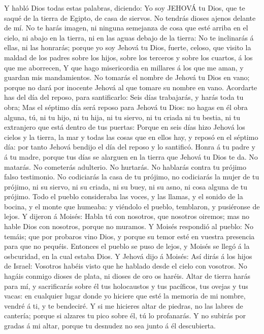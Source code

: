  Y habló Dios todas estas palabras, diciendo:
 Yo soy JEHOVÁ tu Dios, que te saqué de la tierra de
Egipto, de casa de siervos.  No tendrás dioses ajenos
delante de mí.  No te harás imagen, ni ninguna semejanza
de cosa que esté arriba en el cielo, ni abajo en la tierra, ni en las
aguas debajo de la tierra:  No te inclinarás á ellas, ni
las honrarás; porque yo soy Jehová tu Dios, fuerte, celoso, que visito
la maldad de los padres sobre los hijos, sobre los terceros y sobre los
cuartos, á los que me aborrecen,  Y que hago misericordia
en millares á los que me aman, y guardan mis mandamientos.
 No tomarás el nombre de Jehová tu Dios en vano; porque no
dará por inocente Jehová al que tomare su nombre en vano. 
Acordarte has del día del reposo, para santificarlo:  Seis
días trabajarás, y harás toda tu obra;  Mas el séptimo
día será reposo para Jehová tu Dios: no hagas en él obra alguna, tú, ni
tu hijo, ni tu hija, ni tu siervo, ni tu criada ni tu bestia, ni tu
extranjero que está dentro de tus puertas:  Porque en
seis días hizo Jehová los cielos y la tierra, la mar y todas las cosas
que en ellos hay, y reposó en el séptimo día: por tanto Jehová bendijo
el día del reposo y lo santificó.  Honra á tu padre y á
tu madre, porque tus días se alarguen en la tierra que Jehová tu Dios te
da.  No matarás.  No cometerás adulterio.
 No hurtarás.  No hablarás contra tu
prójimo falso testimonio.  No codiciarás la casa de tu
prójimo, no codiciarás la mujer de tu prójimo, ni su siervo, ni su
criada, ni su buey, ni su asno, ni cosa alguna de tu prójimo.
 Todo el pueblo consideraba las voces, y las llamas, y el
sonido de la bocina, y el monte que humeaba: y viéndolo el pueblo,
temblaron, y pusiéronse de lejos.  Y dijeron á Moisés:
Habla tú con nosotros, que nosotros oiremos; mas no hable Dios con
nosotros, porque no muramos.  Y Moisés respondió al
pueblo: No temáis; que por probaros vino Dios, y porque su temor esté en
vuestra presencia para que no pequéis.  Entonces el
pueblo se puso de lejos, y Moisés se llegó á la osbcuridad, en la cual
estaba Dios.  Y Jehová dijo á Moisés: Así dirás á los
hijos de Israel: Vosotros habéis visto que he hablado desde el cielo con
vosotros.  No hagáis conmigo dioses de plata, ni dioses
de oro os haréis.  Altar de tierra harás para mí, y
sacrificarás sobre él tus holocaustos y tus pacíficos, tus ovejas y tus
vacas: en cualquier lugar donde yo hiciere que esté la memoria de mi
nombre, vendré á ti, y te bendeciré.  Y si me hicieres
altar de piedras, no las labres de cantería; porque si alzares tu pico
sobre él, tú lo profanarás.  Y no subirás por gradas á mi
altar, porque tu desnudez no sea junto á él descubierta.

